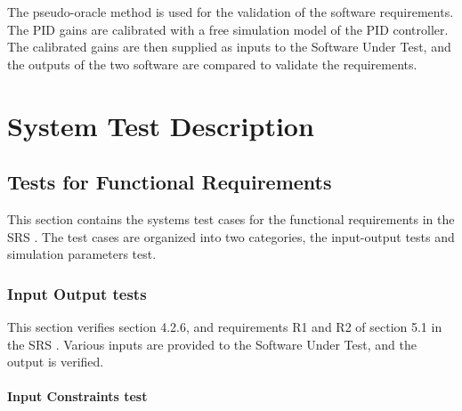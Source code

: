 \documentclass[12pt, titlepage]{article}
\begin{document}
The pseudo-oracle method is used for the validation of the software requirements.
The PID gains are calibrated with a free simulation model \cite{Free_PID} of the 
PID controller. The calibrated gains are then supplied as inputs to the Software 
Under Test, and the outputs of the two software are compared to validate 
the requirements.

\section{System Test Description} \label{sec_systems_tests}
	
\subsection{Tests for Functional Requirements}


This section contains the systems test cases for the functional requirements in the
SRS \cite{SRS}. The test cases are organized into two categories, the input-output 
tests and simulation parameters test.


\subsubsection{Input Output tests}

  
This section verifies section 4.2.6, and requirements R1 and R2 of section 5.1
in the SRS \cite {SRS}. Various inputs are provided to the Software Under Test, 
and the output is verified. 
		
\paragraph{Input Constraints test}
\end{document}
